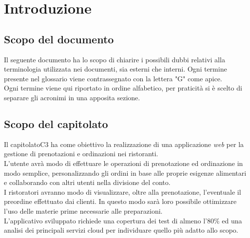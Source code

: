 \section{Introduzione}
\subsection{Scopo del documento}
Il seguente documento ha lo scopo di chiarire i possibili dubbi relativi alla terminologia utilizzata nei documenti, sia esterni che interni.
Ogni termine presente nel glossario viene contrassegnato con la lettera "G" come apice. \\
Ogni termine viene qui riportato in ordine alfabetico, per praticità si è scelto di separare gli acronimi in una apposita sezione.


\subsection{Scopo del capitolato}
Il capitolato\g C3 ha come obiettivo la realizzazione di una applicazione \textit{web} per la gestione di prenotazioni e ordinazioni nei ristoranti. \\
L'utente avrà modo di effettuare le operazioni di prenotazione ed ordinazione in modo semplice, personalizzando gli ordini in base alle proprie esigenze alimentari e collaborando con altri utenti nella divisione del conto. \\
I ristoratori avranno modo di visualizzare, oltre alla prenotazione, l'eventuale il preordine effettuato dai clienti. 
In questo modo sarà loro possibile ottimizzare l'uso delle materie prime necessarie alle preparazioni. \\
L'applicativo sviluppato richiede una copertura dei test di almeno l'$80\%$ ed una analisi dei principali servizi cloud per individuare quello più adatto allo scopo.